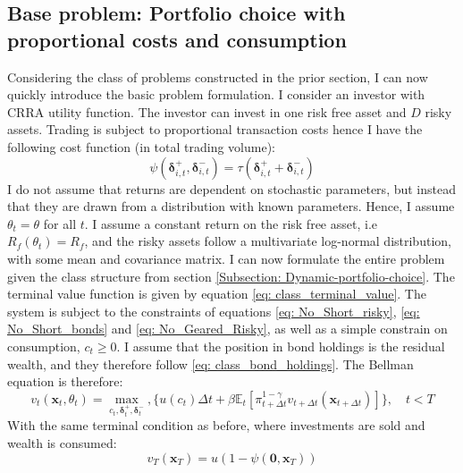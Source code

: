 \documentclass[11pt]{article}
\begin{document}
\subsection{Base problem: Portfolio choice with proportional costs and consumption}\label{Subsection: Base_Problem}
Considering the class of problems constructed in the prior section,
I can now quickly introduce the basic problem formulation.
I consider an investor with CRRA utility function. The investor can invest in one risk free asset and $D$ risky assets.
Trading is subject to proportional transaction costs hence I have the following cost function (in total trading volume):
\begin{equation} \label{eq: base_model_transaction-cost}
  \psi (\boldsymbol{\delta}^{+}_{i,t}, \boldsymbol{\delta}^{-}_{i,t} ) = \tau (\boldsymbol{\delta}^{+}_{i,t} + \boldsymbol{\delta}^{-}_{i,t}) 
\end{equation}
I do not assume that returns are dependent on stochastic parameters, but instead that they are drawn from a distribution with known parameters.
Hence, I assume \( \theta_{t} = \theta \) for all $t$. I assume a constant return on the risk free asset, i.e $R_{f}(\theta_t) = R_{f}$,
and the risky assets follow a multivariate log-normal distribution, with some mean and covariance matrix.
I can now formulate the entire problem given the class structure from section \ref{Subsection: Dynamic-portfolio-choice}.
The terminal value function is given by equation \eqref{eq: class_terminal_value}. 
The system is subject to the constraints of equations \eqref{eq: No_Short_risky}, \eqref{eq: No_Short_bonds} and \eqref{eq: No_Geared_Risky},
as well as a simple constrain on consumption, $c_t \geq 0$.
I assume that the position in bond holdings is the residual wealth, and they therefore follow
\eqref{eq: class_bond_holdings}. The Bellman equation is therefore:
\[  
  v_{t} (\mathbf{x}_{t}, \theta_t) = \max_{c_t , \boldsymbol{\delta}^{+}_{t}, \boldsymbol{\delta}^{-}_{t}  },  \{ u(c_t) 
  \Delta t + \beta \mathbb{E}_{t} \left[ 
    \pi_{t+\Delta t}^{1-\gamma}
    v_{t+\Delta t} (\mathbf{x}_{t+\Delta t }) 
    \right] \} , \quad t < T 
\]
With the same terminal condition as before, where investments are sold and wealth is consumed:
\[
  v_T (\mathbf{x}_T) = u  (1 - \psi( \mathbf{0},\mathbf{x}_T))
\]
\end{document}
